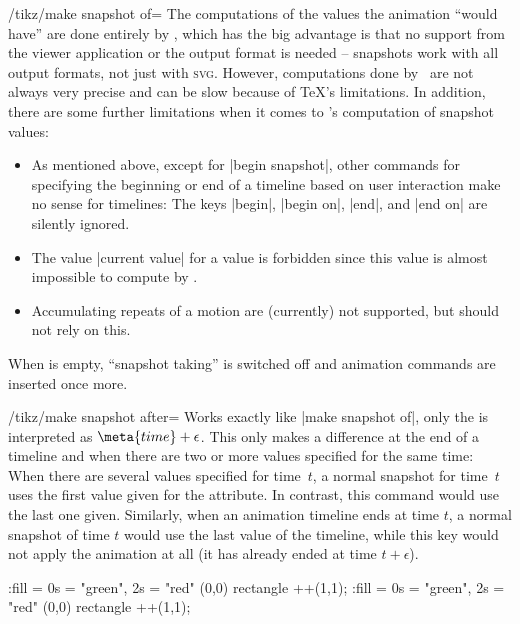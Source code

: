 \begin{key}{/tikz/make snapshot of=}
  The computations of the values the animation ``would have'' are done
  entirely by \tikzname, which has the big advantage is that no
  support from the viewer application or the output format is needed
  -- snapshots work with all output formats, not just with
  \textsc{svg}. However, computations done by \tikzname\ are not
  always very precise and can be slow because of \TeX's
  limitations. In addition, there are some further limitations when it
  comes to \tikzname's computation of snapshot values:

  \begin{itemize}
  \item As mentioned above, except for |begin snapshot|, other
    commands for specifying the beginning or end of a timeline based
    on user interaction make no sense for timelines: The keys |begin|,
    |begin on|, |end|, and |end on| are silently ignored.
  \item The value |current value| for a value is forbidden since this
    value is almost impossible to compute by \tikzname.
  \item Accumulating repeats of a motion are (currently) not
    supported, but should not rely on this.
  \end{itemize}
  
  When  is empty, ``snapshot taking'' is switched off and
  animation commands are inserted once more.
\end{key}


\begin{key}{/tikz/make snapshot after=}
  Works exactly like |make snapshot of|, only the  is
  interpreted as $\meta{time} + \epsilon$. This only makes a
  difference at the end of a timeline and when there are two or more
  values specified for the same time: When there are several values
  specified for time~$t$, a normal snapshot for time~$t$ uses the
  first value given for the attribute. In contrast, this command would
  use the last one given. Similarly, when an animation timeline ends
  at time $t$, a normal snapshot of time $t$ would use the last
  value of the timeline, while this key would not apply the animation
  at all (it has already ended at time $t + \epsilon$).
  
\begin{codeexample}[]
\tikz [make snapshot of = 2s] 
  \fill :fill = { 0s = "green", 2s = "red" } (0,0) rectangle ++(1,1);
\tikz [make snapshot after = 2s] 
  \fill :fill = { 0s = "green", 2s = "red" } (0,0) rectangle ++(1,1);
\end{codeexample}
\end{key}


